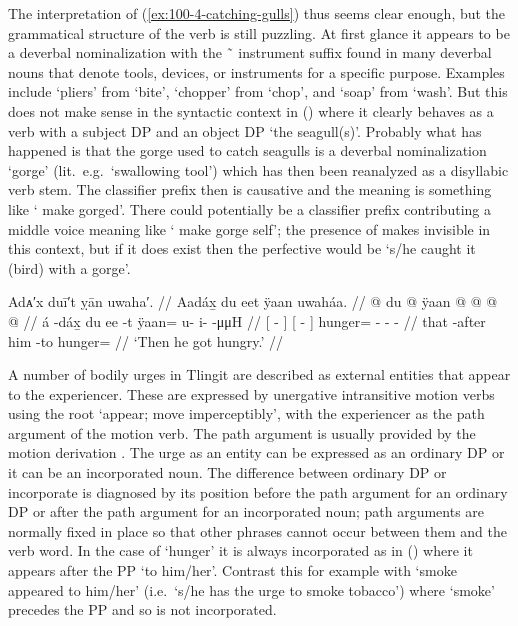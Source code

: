 The interpretation of (\ref{ex:100-4-catching-gulls}) thus seems clear enough, but the grammatical structure of the verb  is still puzzling.
At first glance it appears to be a deverbal nominalization with the  \~\  instrument suffix found in many deverbal nouns that denote tools, devices, or instruments for a specific purpose.
Examples include  ‘pliers’ from  ‘bite’,  ‘chopper’ from  ‘chop’, and  ‘soap’ from  ‘wash’.
But this does not make sense in the syntactic context in (\lastx) where it clearly behaves as a verb with a subject DP  and an object DP  ‘the seagull(s)’.
Probably what has happened is that the gorge used to catch seagulls is a deverbal nominalization  ‘gorge’ (lit.\ e.g.\ ‘swallowing tool’) which has then been reanalyzed as a disyllabic verb stem.
The  classifier prefix then is causative and the meaning is something like ‘ make  gorged’.
There could potentially be a  classifier prefix contributing a middle voice meaning like ‘ make  gorge self’; the presence of  makes  invisible in this context, but if it does exist then the perfective would be  ‘s/he caught it (bird) with a gorge’.

\ex\label{ex:100-5-he-got-hungry}%
%
\begingl
	\glpreamble	Adᴀ′x duī′t ỵān uwaha′. //
	\glpreamble	Aadáx̱ du eet ÿaan uwaháa. //
	\gla	{}  @ {} {} {} du  @ {} {}
			ÿaan @  @ {} @ {} @ {} //
	\glb	{} á -dáx̱ {} {} du ee -t {}
			ÿaan= u- i-  -μμH //
	\glc	{}[  - {}] {}[   - {}]
			hunger= - -  - //
	\gld	{} that -after {} {} him {} -to {}
			hunger=  {} {} {} {} {} //
	\glft	‘Then he got hungry.’
		//
\endgl
\xe

A number of bodily urges in Tlingit are described as external entities that appear to the experiencer.
These are expressed by unergative intransitive motion verbs using the root  ‘appear; move imperceptibly’, with the experiencer as the path argument of the motion verb.
The path argument is usually provided by the motion derivation .
The urge as an entity can be expressed as an ordinary DP or it can be an incorporated noun.
The difference between ordinary DP or incorporate is diagnosed by its position before the path argument for an ordinary DP or after the path argument for an incorporated noun; path arguments are normally fixed in place so that other phrases cannot occur between them and the verb word.
In the case of  ‘hunger’ it is always incorporated as in (\lastx) where it appears after the PP  ‘to him/her’.
Contrast this for example with  ‘smoke appeared to him/her’ (i.e.\ ‘s/he has the urge to smoke tobacco’) where  ‘smoke’ precedes the PP and so is not incorporated.

